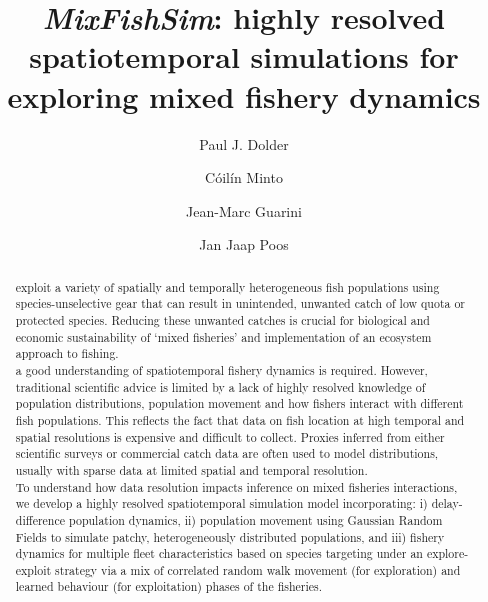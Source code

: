 \documentclass[review]{elsarticle}
\begin{document}
\begin{frontmatter}
\title{\emph{MixFishSim}: highly resolved spatiotemporal simulations for
	exploring mixed fishery dynamics}

\author[1,2]{Paul J. Dolder}

\author[1]{Cóilín Minto}
\author[3]{Jean-Marc Guarini}
\author[4]{Jan Jaap Poos}

\address[1]{Galway-Mayo Institute of Technology (GMIT), Dublin Road, Galway,
	Ireland} 
\address[2]{Centre for Environment, Fisheries and Aquaculture Science (Cefas),
	Pakefield Road, Lowestoft, UK}
\address[3]{, 4 Place Jussieu,
	75005 Paris, France}
\address[4]{Wageningen Marine Research, Haringkade 1 1976 CP IJmuiden,
	Netherlands}

\begin{abstract}

 exploit a variety 
of spatially and temporally heterogeneous fish populations using
species-unselective gear that can result in unintended, unwanted catch of low
quota or protected species. Reducing these unwanted catches is crucial for
biological and economic sustainability of `mixed fisheries' and implementation
of an ecosystem approach to fishing. \\

 a good understanding of
spatiotemporal fishery dynamics is required. However, traditional scientific
advice is limited by a lack of highly resolved knowledge of population
distributions, population movement and how fishers interact with different fish
populations. This reflects the fact that data on fish location at high temporal
and spatial resolutions is expensive and difficult to collect. Proxies inferred
from either scientific surveys or commercial catch data are often used to model
distributions, usually with sparse data at limited spatial and temporal
resolution. \\ 

To understand how data resolution impacts inference on mixed fisheries
interactions, we develop a highly resolved spatiotemporal simulation model
incorporating: i) delay-difference population dynamics, ii) population movement
using Gaussian Random Fields to simulate patchy, heterogeneously distributed
populations, and iii) fishery dynamics for multiple fleet characteristics based
on species targeting under an explore-exploit strategy via a mix of correlated
random walk movement (for exploration) and learned behaviour (for exploitation)
phases of the fisheries.  \\ 


\end{abstract}
\end{frontmatter}
\end{document}
